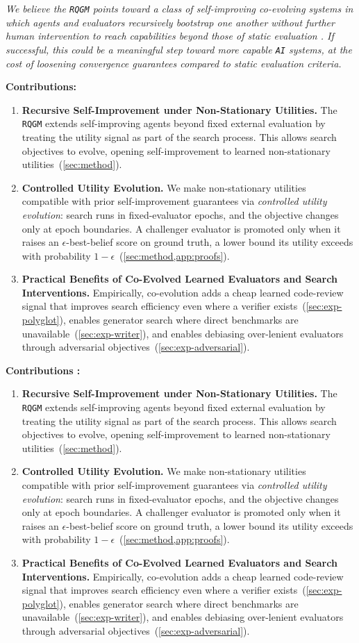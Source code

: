 \documentclass{paper}
\newcommand{\introtakeawaybox}[2][]{\begin{tcolorbox}[colback=ThemeGoldBrown!5,
      colframe=ThemeGoldBrown!35,
      boxrule=0.6pt,
      arc=3pt,
      left=5pt, right=5pt, top=2.5pt, bottom=2.5pt,
      fontupper={\small}
  ]
    \if\relax\detokenize{#1}\relax\textbf{Contributions:} #2\else\textbf{Contributions #1:} #2\fi\end{tcolorbox}\vspace*{-0.1cm}
}
\newcommand{\ourmethod}{\texttt{RQGM}\xspace}
\newcommand{\theourmethod}{the \ourmethod}
\newcommand{\Theourmethod}{The \ourmethod}
\newcommand{\AI}{\texttt{AI}}
\begin{document}
\emph{We believe \theourmethod points toward a class of self-improving co-evolving systems in which agents and evaluators recursively bootstrap one another without further human intervention to reach capabilities beyond those of static evaluation . If successful, this could be a meaningful step toward more capable \AI{} systems, at the cost of loosening convergence guarantees compared to static evaluation criteria.}
\introtakeawaybox{
 \begin{enumerate}[leftmargin=*]
 \item \textbf{Recursive Self-Improvement under Non-Stationary Utilities.}
 \Theourmethod extends self-improving agents beyond fixed external evaluation by treating the utility signal as part of the search process. This allows search objectives to evolve, opening self-improvement to learned non-stationary utilities~(\cref{sec:method}).
 \item \textbf{Controlled Utility Evolution.}
 We make non-stationary utilities compatible with prior self-improvement guarantees via \emph{controlled utility evolution}: search runs in fixed-evaluator epochs, and the objective changes only at epoch boundaries. A challenger evaluator is promoted only when it raises an $\epsilon$-best-belief score on ground truth, a lower bound its utility exceeds with probability $1-\epsilon$~(\cref{sec:method,app:proofs}).
 \item \textbf{Practical Benefits of Co-Evolved Learned Evaluators and Search Interventions.}
 Empirically, co-evolution adds a cheap learned code-review signal that improves search efficiency even where a verifier exists~(\cref{sec:exp-polyglot}), enables generator search where direct benchmarks are unavailable~(\cref{sec:exp-writer}), and enables debiasing over-lenient evaluators through adversarial objectives~(\cref{sec:exp-adversarial}).
 \end{enumerate}
 }
\end{document}
